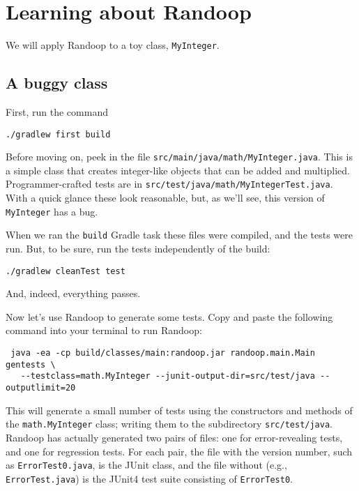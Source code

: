 \documentclass[11pt, oneside]{article} %
\newcommand{\code}[1]{{\texttt{#1}}}
\newcommand{\cmd}[1]{{\texttt{#1}}}
\begin{document}
\section{Learning about Randoop}\label{thebasics}
We will apply Randoop to a toy class, \texttt{MyInteger}.

\subsection{A buggy class}
First, run the command
\begin{verbatim}
./gradlew first build
\end{verbatim}

Before moving on, peek in the file \texttt{src/main/java/math/MyInteger.java}.
This is a simple class that creates integer-like objects that can be added and multiplied.
Programmer-crafted tests are in \texttt{src/test/java/math/MyIntegerTest.java}.
With a quick glance these look reasonable, but, as we'll see, this version of \code{MyInteger} has a bug.

When we ran the \cmd{build} Gradle task these files were compiled, and the tests were run.
But, to be sure, run the tests independently of the build:
\begin{verbatim}
./gradlew cleanTest test
\end{verbatim}
And, indeed, everything passes.

Now let's use Randoop to generate some tests.
Copy and paste the following command into your terminal to run Randoop:
\begin{verbatim}
 java -ea -cp build/classes/main:randoop.jar randoop.main.Main gentests \
   --testclass=math.MyInteger --junit-output-dir=src/test/java --outputlimit=20
\end{verbatim}
This will generate a small number of tests using the constructors and methods of the \texttt{math.MyInteger} class; writing them to the subdirectory \texttt{src/test/java}.
Randoop has actually generated two pairs of files: one for error-revealing tests, and one for regression tests.
For each pair, the file with the version number, such as \texttt{ErrorTest0.java}, is the JUnit class, and the file without (e.g., \texttt{ErrorTest.java}) is the JUnit4 test suite consisting of \code{ErrorTest0}.
\end{document}
